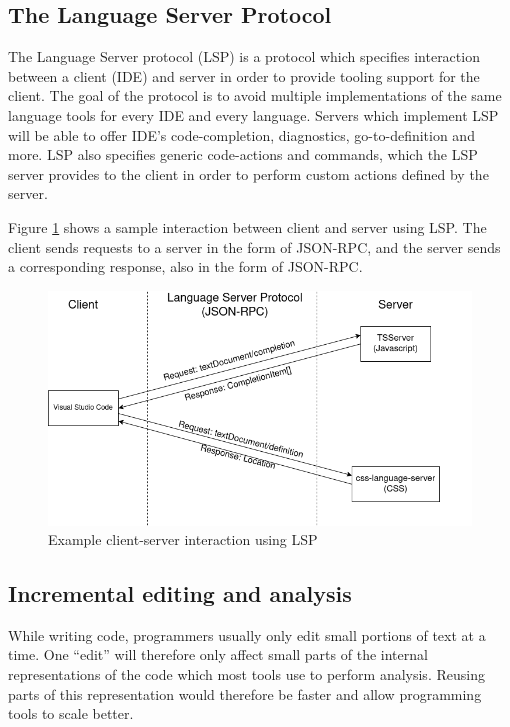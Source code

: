 \documentclass[12pt]{article}
\begin{document}
\subsection{The Language Server Protocol}

The Language Server protocol (LSP) is a protocol which specifies interaction between a
client (IDE) and server in order to provide tooling support for the client. The goal of
the protocol is to avoid multiple implementations of the same language tools for every
IDE and every language. Servers which implement LSP will be able to offer IDE's
code-completion, diagnostics, go-to-definition and more. LSP also specifies generic
code-actions and commands, which the LSP server provides to the client in order to perform
custom actions defined by the server.

Figure \ref{fig:lspcommunication} shows a sample interaction between client and server
using LSP. The client sends requests to a server in the form of JSON-RPC, and the server
sends a corresponding response, also in the form of JSON-RPC.

\begin{figure}
	\includegraphics[width=\textwidth]{images/lspcommunication.png}
	\caption{Example client-server interaction using LSP}
	\label{fig:lspcommunication}
\end{figure}

\subsection{Incremental editing and analysis}

While writing code, programmers usually only edit small portions of text at a time. One
``edit'' will therefore only affect small parts of the internal representations of the
code which most tools use to perform analysis. Reusing parts of this representation would
therefore be faster and allow programming tools to scale better.
\end{document}
